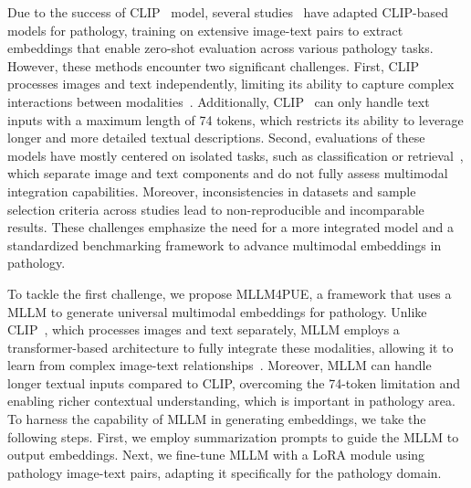 Due to the success of CLIP~\cite{radford2021learning} model, several studies~\cite{lu2023visual, huang2023visual, sun2024pathasst, ikezogwo2024quilt, lu2024visual} have adapted CLIP-based models for pathology, training on extensive image-text pairs to extract embeddings that enable zero-shot evaluation across various pathology tasks. However, these methods encounter two significant challenges. First, CLIP~\cite{radford2021learning} processes images and text independently, limiting its ability to capture complex interactions between modalities~\cite{jiang2024e5}.  Additionally, CLIP~\cite{radford2021learning} can only handle text inputs with a maximum length of 74 tokens, which restricts its ability to leverage longer and more detailed textual descriptions. Second, evaluations of these models have mostly centered on isolated tasks, such as classification or retrieval~\cite{lu2023visual, sun2024pathasst, ikezogwo2024quilt}, which separate image and text components and do not fully assess multimodal integration capabilities. Moreover, inconsistencies in datasets and sample selection criteria across studies lead to non-reproducible and incomparable results. These challenges emphasize the need for a more integrated model and a standardized benchmarking framework to advance multimodal embeddings in pathology.

To tackle the first challenge, we propose MLLM4PUE, a framework that uses a MLLM to generate universal multimodal embeddings for pathology. Unlike CLIP~\cite{radford2021learning}, which processes images and text separately, MLLM employs a transformer-based architecture to fully integrate these modalities, allowing it to learn from complex image-text relationships~\cite{liu2024visual, liu2024improved}. Moreover, MLLM can handle longer textual inputs compared to CLIP, overcoming the 74-token limitation and enabling richer contextual understanding, which is important in pathology area. To harness the capability of MLLM in generating embeddings, we take the following steps. First, we employ summarization prompts to guide the MLLM to output embeddings. Next, we fine-tune MLLM with a LoRA module using pathology image-text pairs, adapting it specifically for the pathology domain.

